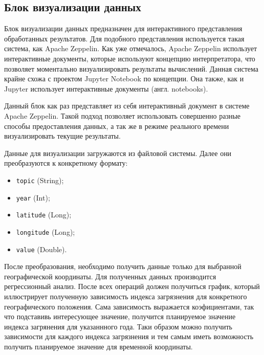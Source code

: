 \subsection{Блок визуализации данных}

Блок визуализации данных предназначен для интерактивного представления обработанных результатов.
Для подобного представления используется такая система, как Apache Zeppelin.
Как уже отмечалось, Apache Zeppelin использует интерактивные документы, которые используют концепцию интерпретатора, что позволяет моментально визуализировать результаты вычислений.
Данная система крайне схожа с проектом Jupyter Notebook по концепции.
Она также, как и Jupyter использует интерактивные документы (англ. notebooks).

Данный блок как раз представляет из себя интерактивный документ в системе Apache Zeppelin.
Такой подход позволяет использовать совершенно разные способы предоставления данных, а так же в режиме реального времени визуализировать текущие результаты.

Данные для визуализации загружаются из файловой системы.
Далее они преобразуются к конкретному формату:

\begin{itemize}
    \item \texttt{topic} (String);
    \item \texttt{year} (Int);
    \item \texttt{latitude} (Long);
    \item \texttt{longitude} (Long);
    \item \texttt{value} (Double).
\end{itemize}

После преобразования, необходимо получить данные только для выбранной географической координаты.
Для полученных данных производится регрессионный анализ.
После всех операций должен получиться график, который иллюстрирует полученную зависимость индекса загрязнения для конкретного географического положения.
Сама зависимость выражается коэфициентами, так что подставивь интересующее значение, получится планируемое значение индекса загрянения для указаннного года.
Таки образом можно получить зависимости для каждого индекса загрязнения и тем самым иметь возможность получить планируемое значение для временной координаты.
